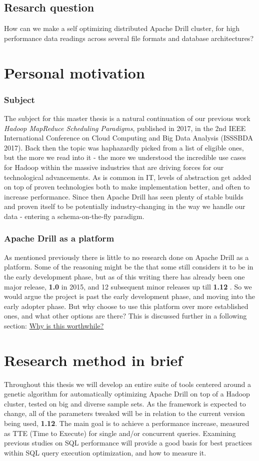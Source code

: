 \documentclass[a4paper,english]{report}
\begin{document}
		\subsection{Resarch question}
		How can we make a self optimizing distributed Apache Drill cluster, for high performance data readings across several file formats and database architectures?
		
		\section{Personal motivation}
			\subsubsection{Subject}
			The subject for this master thesis is a natural continuation of our previous work \emph{Hadoop MapReduce Scheduling Paradigms}, published in 2017, in the 2nd IEEE International Conference on Cloud Computing and Big Data Analysis (ISSSBDA 2017). Back then the topic was haphazardly picked from a list of eligible ones, but the more we read into it - the more we understood the incredible use cases for Hadoop within the massive industries that are driving forces for our technological advancements. As is common in IT, levels of abstraction get added on top of proven technologies both to make implementation better, and often to increase performance. Since then Apache Drill has seen plenty of stable builds and proven itself to be potentially industry-changing in the way we handle our data - entering a schema-on-the-fly paradigm.
			\subsubsection{Apache Drill as a platform}
			As mentioned previously there is little to no research done on Apache Drill as a platform. Some of the reasoning might be the that some still considers it to be in the early development phase, but as of this writing there has already been one major release, \textbf{1.0} in 2015, and 12 subsequent minor releases up till \textbf{1.12} \cite{drill_releases}. So we would argue the project is past the early development phase, and moving into the early adopter phase. But why choose to use this platform over more established ones, and what other options are there? This is discussed further in a following section: \hyperref[sec:why_drill]{Why is this worthwhile?}
		
		\section{Research method in brief}
		Throughout this thesis we will develop an entire suite of tools centered around a genetic algorithm for automatically optimizing Apache Drill on top of a Hadoop cluster, tested on big and diverse sample sets. As the framework is expected to change, all of the parameters tweaked will be in relation to the current version being used, \textbf{1.12}. The main goal is to achieve a performance increase, measured as TTE (Time to Execute) for single and/or concurrent queries. Examining previous studies on SQL performance will provide a good basis for best practices within SQL query execution optimization, and how to measure it.
		
\end{document}
